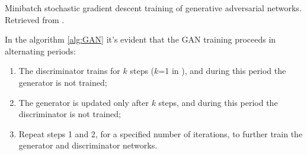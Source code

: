 \begin{algorithm}
  \scriptsize
  \caption{Minibatch stochastic gradient descent training of generative adversarial networks. Retrieved from \cite{GAN_original}.}\label{alg:GAN}
\end{algorithm}


In the algorithm \ref{alg:GAN} it's evident that the \ac{GAN} training proceeds in alternating periods:

\begin{enumerate}
  \item The discriminator trains for $k$ steps ($k$=1 in \cite{GAN_original}), and during this period the generator is not trained;
  \item The generator is updated only after $k$ steps, and during this period the discriminator is not trained; 
  \item Repeat steps 1 and 2, for a specified number of iterations, to further train the generator and discriminator networks.
\end{enumerate}

